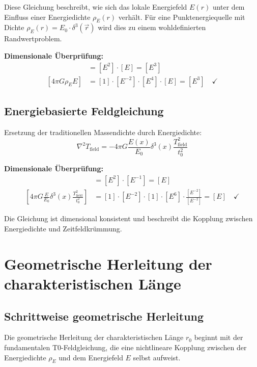 \documentclass[12pt,a4paper]{report}
\newcommand{\rzero}{r_0}                  %
\newcommand{\tzero}{t_0}                  %
\begin{document}
	Diese Gleichung beschreibt, wie sich das lokale Energiefeld $E(r)$ unter dem Einfluss einer Energiedichte $\rho_E(r)$ verhält. Für eine Punktenergiequelle mit Dichte $\rho_E(r) = E_0 \cdot \delta^3(\vec{r})$ wird dies zu einem wohldefinierten Randwertproblem.
	
	\textbf{Dimensionale Überprüfung:}
	\begin{align}
		[\nabla^2 E] &= [E^2] \cdot [E] = [E^3] \\
		[4\pi G \rho_E E] &= [1] \cdot [E^{-2}] \cdot [E^4] \cdot [E] = [E^3] \quad \checkmark
	\end{align}
	
	\subsection{Energiebasierte Feldgleichung}
	\label{subsec:energy_field_equation_corrected}
	
	Ersetzung der traditionellen Massendichte durch Energiedichte:
	\begin{equation}
		\boxed{\nabla^2 T_{\text{field}} = -4\pi G \frac{E(x)}{E_0} \delta^3(x) \frac{T_{\text{field}}^2}{\tzero^2}}
		\label{eq:field_equation_energy_based}
	\end{equation}
	
	\textbf{Dimensionale Überprüfung:}
	\begin{align}
		[\nabla^2 T_{\text{field}}] &= [E^2] \cdot [E^{-1}] = [E] \\
		\left[4\pi G \frac{E}{E_0} \delta^3(x) \frac{T_{\text{field}}^2}{\tzero^2}\right] &= [1] \cdot [E^{-2}] \cdot [1] \cdot [E^6] \cdot \frac{[E^{-2}]}{[E^{-2}]} = [E] \quad \checkmark
	\end{align}
	
	Die Gleichung ist dimensional konsistent und beschreibt die Kopplung zwischen Energiedichte und Zeitfeldkrümmung.
	
	\section{Geometrische Herleitung der charakteristischen Länge}
	\label{sec:geometric_derivation}
	
	\subsection{Schrittweise geometrische Herleitung}
	\label{subsec:geometric_derivation_steps}
	
	Die geometrische Herleitung der charakteristischen Länge $\rzero$ beginnt mit der fundamentalen T0-Feldgleichung, die eine nichtlineare Kopplung zwischen der Energiedichte $\rho_E$ und dem Energiefeld $E$ selbst aufweist.
	
\end{document}
